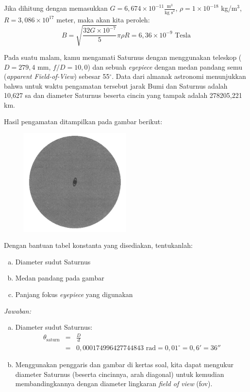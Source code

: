 \documentclass[11pt,fleqn]{exam}
\newcommand*{\de}{\ensuremath{^{\circ}}}
\newcommand*{\am}{'}
\newcommand*{\as}{''}
\begin{document}
\begin{questions}
Jika dihitung dengan memasukkan $G = 6,674 \times 10^{-11} \frac{  \text{m}^3}{\text{kg s}^2}$, $\rho = 1 \times 10^{-18}$ kg/m$^{3}$, $R = 3,086 \times 10^{17} $ meter, maka akan kita peroleh:
$$B = \sqrt{\frac{32 G \times 10^{-7}}{5}} \pi \rho R  = 6,36 \times 10^{-9} \text{  Tesla}$$ 

\vspace{0.5cm}
\question Pada suatu malam, kamu mengamati Saturnus dengan menggunakan teleskop ($D = 279,4$ mm, $f/D = 10,0$) dan sebuah \textit{eyepiece} dengan medan pandang semu (\textit{apparent Field-of-View}) sebesar 55\de. Data dari almanak astronomi menunjukkan bahwa untuk waktu pengamatan tersebut jarak Bumi dan Saturnus adalah 10,627 sa dan diameter Saturnus beserta cincin yang tampak adalah 278205,221 km.

Hasil pengamatan ditampilkan pada gambar berikut:
\begin{figure}[H]
	\centering
	\includegraphics[width=0.5\textwidth]{saturn.png}
	\label{fig:saturn}
\end{figure}
Dengan bantuan tabel konstanta yang disediakan, tentukanlah:
\begin{enumerate}[a.]
	\item Diameter sudut Saturnus
	\item Medan pandang pada gambar
	\item Panjang fokus \textit{eyepiece} yang digunakan
\end{enumerate}


\textit{Jawaban: }

\begin{enumerate}[a.]
	\item Diameter sudut Saturnus:
	\begin{eqnarray*}
	\theta_\text{saturn} &=& \frac{D}{d}\\
	&=& 0,000174996427744843 \text{  rad} =  0,01^{\circ} = 0,6\am = 36\as
	\end{eqnarray*}
	\item Menggunakan penggaris dan gambar di kertas soal, kita dapat mengukur diameter Saturnus (beserta cincinnya, arah diagonal) untuk kemudian membandingkannya dengan diameter lingkaran \textit{field of view} (fov).
	

\end{enumerate}
\end{questions}
\end{document}
